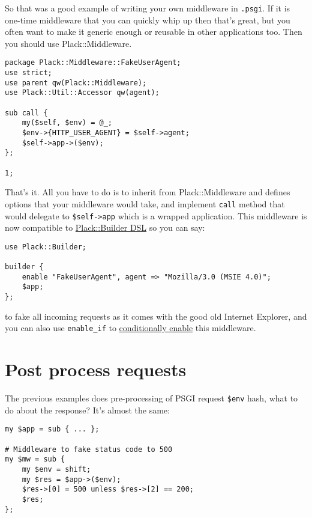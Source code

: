 So that was a good example of writing your own middleware in
\lstinline!.psgi!. If it is one-time middleware that you can quickly
whip up then that's great, but you often want to make it generic enough
or reusable in other applications too. Then you should use
Plack::Middleware.

\begin{lstlisting}
package Plack::Middleware::FakeUserAgent;
use strict;
use parent qw(Plack::Middleware);
use Plack::Util::Accessor qw(agent);

sub call {
    my($self, $env) = @_;
    $env->{HTTP_USER_AGENT} = $self->agent;
    $self->app->($env);
};

1;
\end{lstlisting}

That's it. All you have to do is to inherit from Plack::Middleware and
defines options that your middleware would take, and implement
\lstinline!call! method that would delegate to \lstinline!$self->app!
which is a wrapped application. This middleware is now compatible to
\href{http://advent.plackperl.org/2009/12/day-11-using-plackbuilder.html}{Plack::Builder
DSL} so you can say:

\begin{lstlisting}
use Plack::Builder;

builder {
    enable "FakeUserAgent", agent => "Mozilla/3.0 (MSIE 4.0)";
    $app;
};
\end{lstlisting}

to fake all incoming requests as it comes with the good old Internet
Explorer, and you can also use \lstinline!enable_if! to
\href{http://advent.plackperl.org/2009/12/day-18-load-middleware-conditionally.html}{conditionally
enable} this middleware.

\section{Post process requests}\label{post-process-requests}

The previous examples does pre-processing of PSGI request
\lstinline!$env! hash, what to do about the response? It's almost the
same:

\begin{lstlisting}
my $app = sub { ... };

# Middleware to fake status code to 500
my $mw = sub {
    my $env = shift;
    my $res = $app->($env);
    $res->[0] = 500 unless $res->[2] == 200;
    $res;
};
\end{lstlisting}

